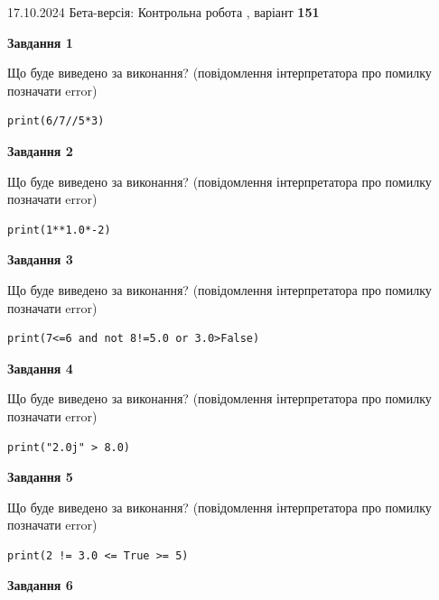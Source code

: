 \documentclass[12pt, ukrainian]{article}
\begin{document}
{\Large{17.10.2024 Бета-версія: Контрольна робота , варіант  \No \textbf { 151 }\par}}
{
\begin {large}
{\begin {center}\textbf{Завдання 1}\end {center}}

Що буде виведено за виконання? (повідомлення інтерпретатора про помилку позначати error)\par
\begin{verbatim}
print(6/7//5*3)
\end{verbatim}

{\begin {center}\textbf{Завдання 2}\end {center}}

Що буде виведено за виконання? (повідомлення інтерпретатора про помилку позначати error)\par
\begin{verbatim}
print(1**1.0*-2)
\end{verbatim}

{\begin {center}\textbf{Завдання 3}\end {center}}

Що буде виведено за виконання? (повідомлення інтерпретатора про помилку позначати error)\par
\begin{verbatim}
print(7<=6 and not 8!=5.0 or 3.0>False)
\end{verbatim}

{\begin {center}\textbf{Завдання 4}\end {center}}

Що буде виведено за виконання? (повідомлення інтерпретатора про помилку позначати error)\par
\begin{verbatim}
print("2.0j" > 8.0)
\end{verbatim}

{\begin {center}\textbf{Завдання 5}\end {center}}

Що буде виведено за виконання? (повідомлення інтерпретатора про помилку позначати error)\par
\begin{verbatim}
print(2 != 3.0 <= True >= 5)
\end{verbatim}

{\begin {center}\textbf{Завдання 6}\end {center}}


\end{large}}
\end{document}
